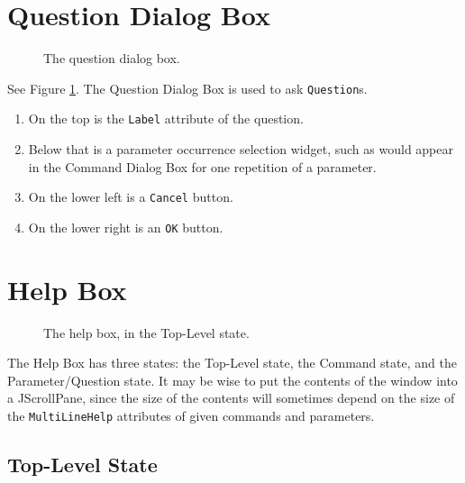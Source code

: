 \documentclass[11pt]{article}
\begin{document}
\section{Question Dialog Box}

\begin{figure}

\centerline{\epsfxsize=3in }

\caption{
  The question dialog box.
}
\label{questionDialogBoxFig}
\end{figure}

See Figure \ref{questionDialogBoxFig}.  The Question Dialog Box
is used to ask {\tt Question}s.
\begin{enumerate}
\item On the top is the {\tt Label} attribute of the question.
\item Below that is a parameter occurrence selection widget, such as
  would appear in the Command Dialog Box for one repetition of a parameter.
\item On the lower left is a {\tt Cancel} button.
\item On the lower right is an {\tt OK} button.
\end{enumerate}

\section{Help Box}

\begin{figure}

\centerline{\epsfxsize=4in }

\caption{
  The help box, in the Top-Level state.
}
\label{helpBox01Fig}
\end{figure}

The Help Box has three states: the Top-Level state, the Command state, and
the Parameter/Question state.  It may be wise to put the contents of the window
into a JScrollPane, since the size of the contents will sometimes depend
on the size of the {\tt MultiLineHelp} attributes of given commands and
parameters.

\subsection{Top-Level State}
\end{document}
